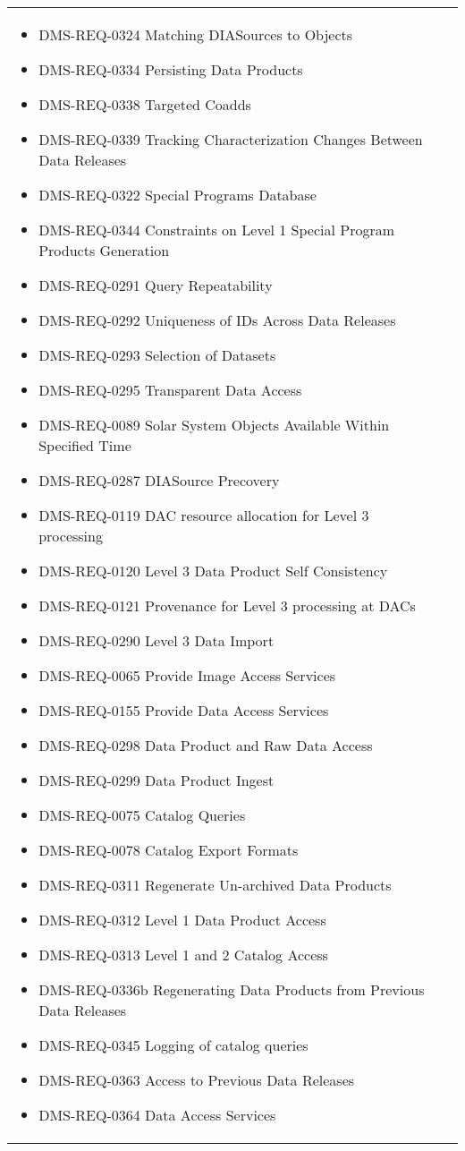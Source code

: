 \begin{xtabular}{lp{0.7\textwidth}}
\begin{itemize}
\item DMS-REQ-0324 Matching DIASources to Objects
\item DMS-REQ-0334 Persisting Data Products
\item DMS-REQ-0338 Targeted Coadds
\item DMS-REQ-0339 Tracking Characterization Changes Between Data Releases
\item DMS-REQ-0322 Special Programs Database
\item DMS-REQ-0344 Constraints on Level 1 Special Program Products Generation
\item DMS-REQ-0291 Query Repeatability
\item DMS-REQ-0292 Uniqueness of IDs Across Data Releases
\item DMS-REQ-0293 Selection of Datasets
\item DMS-REQ-0295 Transparent Data Access
\item DMS-REQ-0089 Solar System Objects Available Within Specified Time
\item DMS-REQ-0287 DIASource Precovery
\item DMS-REQ-0119 DAC resource allocation for Level 3 processing
\item DMS-REQ-0120 Level 3 Data Product Self Consistency
\item DMS-REQ-0121 Provenance for Level 3 processing at DACs
\item DMS-REQ-0290 Level 3 Data Import
\item DMS-REQ-0065 Provide Image Access Services
\item DMS-REQ-0155 Provide Data Access Services
\item DMS-REQ-0298 Data Product and Raw Data Access
\item DMS-REQ-0299 Data Product Ingest
\item DMS-REQ-0075 Catalog Queries
\item DMS-REQ-0078 Catalog Export Formats
\item DMS-REQ-0311 Regenerate Un-archived Data Products
\item DMS-REQ-0312 Level 1 Data Product Access
\item DMS-REQ-0313 Level 1 and 2 Catalog Access
\item DMS-REQ-0336b Regenerating Data Products from Previous Data Releases
\item DMS-REQ-0345 Logging of catalog queries
\item DMS-REQ-0363 Access to Previous Data Releases
\item DMS-REQ-0364 Data Access Services

\end{itemize}
\end{xtabular}
